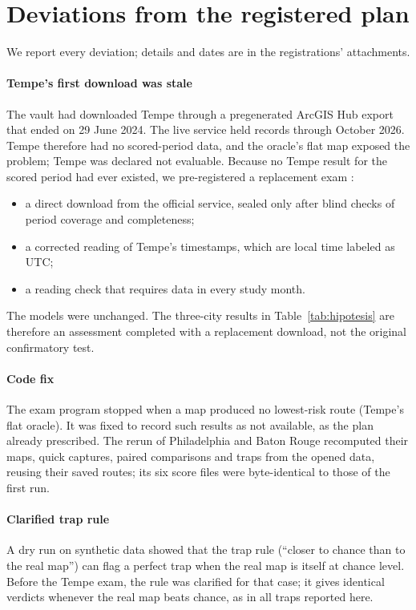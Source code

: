 \documentclass[preprint,12pt,authoryear]{elsarticle}
\begin{document}
\section{Deviations from the registered plan}\label{sec:deviations}
We report every deviation; details and dates are in the registrations' attachments.

\paragraph{Tempe's first download was stale} The vault had downloaded Tempe through a pregenerated ArcGIS Hub export that ended on 29 June 2024. The live service held records through October 2026. Tempe therefore had no scored-period data, and the oracle's flat map exposed the problem; Tempe was declared not evaluable. Because no Tempe result for the scored period had ever existed, we pre-registered a replacement exam \citep{osf_tempe}:
\begin{itemize}
  \item a direct download from the official service, sealed only after blind checks of period coverage and completeness;
  \item a corrected reading of Tempe's timestamps, which are local time labeled as UTC;
  \item a reading check that requires data in every study month.
\end{itemize}
The models were unchanged. The three-city results in Table~\ref{tab:hipotesis} are therefore an assessment completed with a replacement download, not the original confirmatory test.

\paragraph{Code fix} The exam program stopped when a map produced no lowest-risk route (Tempe's flat oracle). It was fixed to record such results as not available, as the plan already prescribed. The rerun of Philadelphia and Baton Rouge recomputed their maps, quick captures, paired comparisons and traps from the opened data, reusing their saved routes; its six score files were byte-identical to those of the first run.

\paragraph{Clarified trap rule} A dry run on synthetic data showed that the trap rule (``closer to chance than to the real map'') can flag a perfect trap when the real map is itself at chance level. Before the Tempe exam, the rule was clarified for that case; it gives identical verdicts whenever the real map beats chance, as in all traps reported here.
\end{document}
